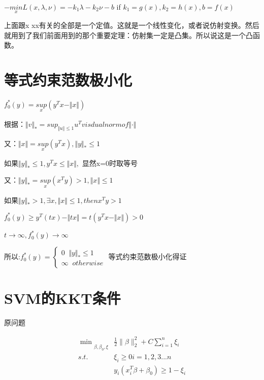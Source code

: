 \documentclass[12pt, a4paper, oneside, fontset=windows]{ctexart}
\begin{document}
$-\underset{x }{min}L\left ( x,\lambda ,\nu  \right )=-k_{1}\lambda -k_{2}\nu -b$ if $k_{1}=g\left ( x \right ),k_{2}=h\left ( x \right ),b=f\left ( x \right )$

上面跟x xx有关的全部是一个定值。这就是一个线性变化，或者说仿射变换。然后就用到了我们前面用到的那个重要定理：仿射集一定是凸集。所以说这是一个凸函数。

\section{等式约束范数极小化}
$f_{0}^{*}\left ( y \right )=\underset{x}{sup}\left ( y^{T} x -\Vert x \Vert\right )$

根据：$\Vert v \Vert_{*}=sup_{\Vert u \Vert\leq 1}u^{T}v is dual norm of \Vert \cdot  \Vert$

又：$\Vert x \Vert=\underset{x}{sup}\left ( y^{T} x \right ),\Vert y  \Vert_{*}\leq 1$

如果$\Vert y  \Vert_{*}\leq 1,  y^{T} x \leq \Vert x  \Vert ,$ 显然x=0时取等号

又：$\Vert y \Vert_{*}=\underset{x}{sup}\left ( x^{T} y \right )> 1,\Vert x  \Vert\leq 1$

如果$\Vert y  \Vert_{*}> 1,  \exists x , \Vert x \Vert \leq 1,then x^{T}y>1$

$f_{0}^{*}\left ( y \right )\geq y^{T}\left ( tx \right )-\Vert tx  \Vert=t\left ( y^{T}x-\Vert x  \Vert \right )> 0$

$t\rightarrow \infty, f_{0}^{*}\left ( y \right )\rightarrow \infty$

所以:$f_{0}^{*}\left ( y \right )=\left\{\begin{matrix}
    0\; \;\Vert y \Vert_{*}\leq 1 \\ 
    \infty\; \; otherwise
    \end{matrix}\right.$
等式约束范数极小化得证
\section{SVM的KKT条件}

原问题


\begin{equation}
\begin{aligned}
    \min\underset{\beta,\beta_{0},\xi}{} &\frac{1}{2} \| \beta\|_{2}^{2} + C\sum_{i = 1}^{n} \xi_{i} \\
    s.t. &\xi_{i} \geq 0 i = 1,2,3...n\\
         &y_{i}(x_{i}^{T}\beta +\beta_{0}) \geq 1 - \xi_{i}
\end{aligned}
\end{equation} 
\end{document}
